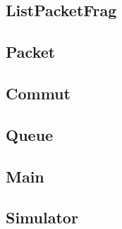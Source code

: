 \documentclass{beamer}
\begin{document}
\subsection{ListPacketFrag}

\subsection{Packet}

\subsection{Commut}

\subsection{Queue}

\subsection{Main}

\subsection{Simulator}
\end{document}
